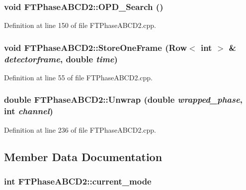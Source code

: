\hypertarget{classFTPhaseABCD2_a23a931c7735b2c0809d05fb08c3ddf0e}{
\subsubsection[{OPD\_\-Search}]{\setlength{\rightskip}{0pt plus 5cm}void FTPhaseABCD2::OPD\_\-Search ()}}
\label{classFTPhaseABCD2_a23a931c7735b2c0809d05fb08c3ddf0e}


Definition at line 150 of file FTPhaseABCD2.cpp.

\hypertarget{classFTPhaseABCD2_ad4b0d7297334da3cb4454f90fd6cb09f}{
\subsubsection[{StoreOneFrame}]{\setlength{\rightskip}{0pt plus 5cm}void FTPhaseABCD2::StoreOneFrame ({\bf Row}$<$ int $>$ \& {\em detectorframe}, \/  double {\em time})}}
\label{classFTPhaseABCD2_ad4b0d7297334da3cb4454f90fd6cb09f}


Definition at line 55 of file FTPhaseABCD2.cpp.

\hypertarget{classFTPhaseABCD2_a075b8f4137bbfcb352f6c97aa43d96c5}{
\subsubsection[{Unwrap}]{\setlength{\rightskip}{0pt plus 5cm}double FTPhaseABCD2::Unwrap (double {\em wrapped\_\-phase}, \/  int {\em channel})}}
\label{classFTPhaseABCD2_a075b8f4137bbfcb352f6c97aa43d96c5}


Definition at line 236 of file FTPhaseABCD2.cpp.



\subsection{Member Data Documentation}
\hypertarget{classFTPhaseABCD2_aa0fa5ac123af8b56b2a26fa05721da61}{
\subsubsection[{current\_\-mode}]{\setlength{\rightskip}{0pt plus 5cm}int {\bf FTPhaseABCD2::current\_\-mode}}}
\label{classFTPhaseABCD2_aa0fa5ac123af8b56b2a26fa05721da61}


